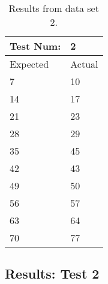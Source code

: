 \begin{table}[]
\centering
\begin{tabular}{ll}
Test Num:                     & 2      \\ \hline
\multicolumn{1}{l|}{Expected} & Actual \\ \hline
\multicolumn{1}{l|}{7}        & 10     \\
\multicolumn{1}{l|}{14}       & 17     \\
\multicolumn{1}{l|}{21}       & 23     \\
\multicolumn{1}{l|}{28}       & 29     \\
\multicolumn{1}{l|}{35}       & 45     \\
\multicolumn{1}{l|}{42}       & 43     \\
\multicolumn{1}{l|}{49}       & 50     \\
\multicolumn{1}{l|}{56}       & 57     \\
\multicolumn{1}{l|}{63}       & 64     \\
\multicolumn{1}{l|}{70}       & 77    
\end{tabular}
\caption{Results from data set 2.}
\label{AngleTest1Result}
\end{table}

\subsection{Results: Test 2}


